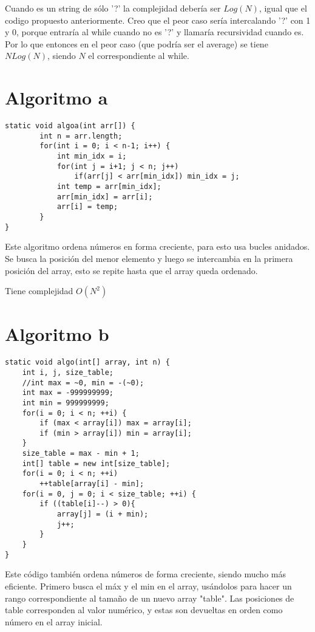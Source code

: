 \documentclass[a4paper,11pt]{article}
\theoremstyle{mytheor}
\begin{document}
Cuando es un string de sólo '?' la complejidad debería ser $Log(N)$, igual que el codigo propuesto anteriormente. Creo que el peor caso sería intercalando '?' con 1 y 0, porque entraría al while cuando no es '?' y llamaría recursividad cuando es. Por lo que entonces en el peor caso (que podría ser el average) se tiene $NLog(N)$, siendo $N$ el correspondiente al while.

\section*{Algoritmo a}

\begin{lstlisting}[label={list:second},caption=Algoritmo a.]
static void algoa(int arr[]) {
		int n = arr.length;
		for(int i = 0; i < n-1; i++) {
			int min_idx = i;
			for(int j = i+1; j < n; j++)
				if(arr[j] < arr[min_idx]) min_idx = j;
			int temp = arr[min_idx];
			arr[min_idx] = arr[i];
			arr[i] = temp;
		}
}
\end{lstlisting}
Este algoritmo ordena números en forma creciente, para esto usa bucles anidados. Se busca la posición del menor elemento y luego se intercambia en la primera posición del array, esto se repite hasta que el array queda ordenado.

Tiene complejidad $O(N^{2})$


\section*{Algoritmo b}
\begin{lstlisting}[label={list:second},caption=Algoritmo b.]
static void algo(int[] array, int n) {
	int i, j, size_table;
    //int max = ~0, min = -(~0);
    int max = -999999999;
    int min = 999999999;
    for(i = 0; i < n; ++i) {
        if (max < array[i]) max = array[i];
        if (min > array[i]) min = array[i];
    }
    size_table = max - min + 1;
    int[] table = new int[size_table];
    for(i = 0; i < n; ++i)
        ++table[array[i] - min];
    for(i = 0, j = 0; i < size_table; ++i) {
        if ((table[i]--) > 0){ 
            array[j] = (i + min);
            j++;
        }
    }
}
\end{lstlisting}
Este código también ordena números de forma creciente, siendo mucho más eficiente. Primero busca el máx y el min en el array, usándolos para hacer un rango correspondiente al tamaño de un nuevo array "table". Las posiciones de table corresponden al valor numérico, y estas son devueltas en orden como número en el array inicial.
\end{document}
